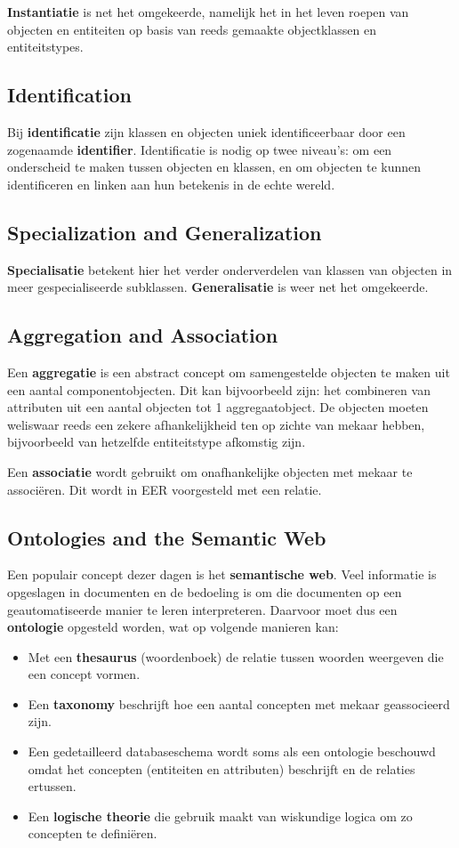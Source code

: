\textbf{Instantiatie} is net het omgekeerde, namelijk het in het leven roepen van objecten en entiteiten op basis van reeds gemaakte objectklassen en entiteitstypes.

\subsection{Identification}
Bij \textbf{identificatie} zijn klassen en objecten uniek identificeerbaar door een zogenaamde \textbf{identifier}. Identificatie is nodig op twee niveau's: om een onderscheid te maken tussen objecten en klassen, en om objecten te kunnen identificeren en linken aan hun betekenis in de echte wereld.

\subsection{Specialization and Generalization}
\textbf{Specialisatie} betekent hier het verder onderverdelen van klassen van objecten in meer gespecialiseerde subklassen. \textbf{Generalisatie} is weer net het omgekeerde.

\subsection{Aggregation and Association}
Een \textbf{aggregatie} is een abstract concept om samengestelde objecten te maken uit een aantal componentobjecten. Dit kan bijvoorbeeld zijn: het combineren van attributen uit een aantal objecten tot 1 aggregaatobject. De objecten moeten weliswaar reeds een zekere afhankelijkheid ten op zichte van mekaar hebben, bijvoorbeeld van hetzelfde entiteitstype afkomstig zijn.

Een \textbf{associatie} wordt gebruikt om onafhankelijke objecten met mekaar te associ\"eren. Dit wordt in EER voorgesteld met een relatie.

\subsection{Ontologies and the Semantic Web}
Een populair concept dezer dagen is het \textbf{semantische web}. Veel informatie is opgeslagen in documenten en de bedoeling is om die documenten op een geautomatiseerde manier te leren interpreteren. Daarvoor moet dus een \textbf{ontologie} opgesteld worden, wat op volgende manieren kan:
\begin{itemize}
\item Met een \textbf{thesaurus} (woordenboek) de relatie tussen woorden weergeven die een concept vormen.
\item Een \textbf{taxonomy} beschrijft hoe een aantal concepten met mekaar geassocieerd zijn.
\item Een gedetailleerd databaseschema wordt soms als een ontologie beschouwd omdat het concepten (entiteiten en attributen) beschrijft en de relaties ertussen.
\item Een \textbf{logische theorie} die gebruik maakt van wiskundige logica om zo concepten te defini\"eren.
\end{itemize}
